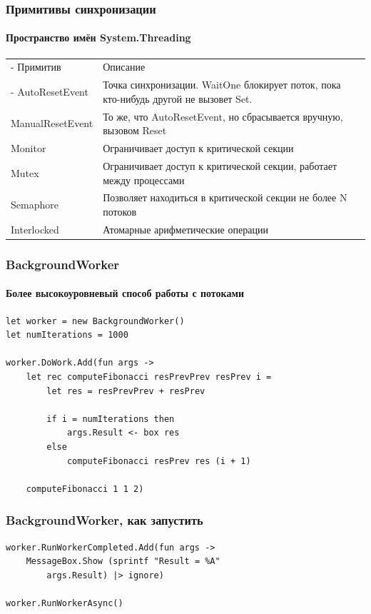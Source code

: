 \documentclass[xetex,mathserif,serif]{beamer}
\begin{document}
	\begin{frame}
		\frametitle{Примитивы синхронизации}
		\framesubtitle{Пространство имён System.Threading}
		\begin{footnotesize}
			\begin{tabu} {| X[0.3 l p] | X[1 l p] |}
				\tabucline-
				Примитив          & Описание           \\
				\tabucline-
				\everyrow{\tabucline-}
				AutoResetEvent    & Точка синхронизации. WaitOne блокирует поток, пока кто-нибудь другой не вызовет Set.  \\
				ManualResetEvent  & То же, что AutoResetEvent, но сбрасывается вручную, вызовом Reset                     \\
				Monitor           & Ограничивает доступ к критической секции                                              \\
				Mutex             & Ограничивает доступ к критической секции, работает между процессами                   \\
				Semaphore         & Позволяет находиться в критической секции не более N потоков                          \\
				Interlocked       & Атомарные арифметические операции                                                     \\
			\end{tabu}
		\end{footnotesize}
	\end{frame}

	\begin{frame}[fragile]
		\frametitle{BackgroundWorker}
		\framesubtitle{Более высокоуровневый способ работы с потоками}
		\begin{verbatim}
let worker = new BackgroundWorker()
let numIterations = 1000

worker.DoWork.Add(fun args ->
    let rec computeFibonacci resPrevPrev resPrev i =
        let res = resPrevPrev + resPrev
        
        if i = numIterations then
            args.Result <- box res
        else
            computeFibonacci resPrev res (i + 1)

    computeFibonacci 1 1 2)
		\end{verbatim}
\end{frame}

	\begin{frame}[fragile]
		\frametitle{BackgroundWorker, как запустить}
		\begin{verbatim}
worker.RunWorkerCompleted.Add(fun args ->
    MessageBox.Show (sprintf "Result = %A" 
        args.Result) |> ignore)

worker.RunWorkerAsync()
		\end{verbatim}
\end{frame}
\end{document}
